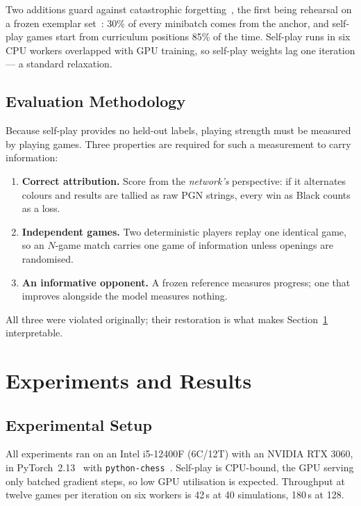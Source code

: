 \documentclass{article}
\begin{document}
Two additions guard against catastrophic
forgetting~\cite{mccloskey1989catastrophic}, the first being rehearsal on a
frozen exemplar set~\cite{rebuffi2017icarl}: 30\% of every minibatch comes
from the anchor, and self-play games start from curriculum positions 85\% of
the time. Self-play runs in six CPU workers overlapped with GPU training, so
self-play weights lag one iteration --- a standard relaxation.

\subsection{Evaluation Methodology}
\label{sec:evalmethod}

Because self-play provides no held-out labels, playing strength must be
measured by playing games. Three properties are required for such a
measurement to carry information:

\begin{enumerate}[noitemsep]
  \item \textbf{Correct attribution.} Score from the \emph{network's}
        perspective: if it alternates colours and results are tallied as raw
        PGN strings, every win as Black counts as a loss.
  \item \textbf{Independent games.} Two deterministic players replay one
        identical game, so an $N$-game match carries one game of information
        unless openings are randomised.
  \item \textbf{An informative opponent.} A frozen reference measures
        progress; one that improves alongside the model measures nothing.
\end{enumerate}

All three were violated originally; their restoration is what makes
Section~\ref{sec:results} interpretable.

\section{Experiments and Results}
\label{sec:results}

\subsection{Experimental Setup}
All experiments ran on an Intel i5-12400F (6C/12T) with an NVIDIA RTX
3060, in PyTorch~2.13~\cite{paszke2019pytorch} with
\texttt{python-chess}~\cite{pythonchess}. Self-play is CPU-bound, the GPU
serving only batched gradient steps, so low GPU utilisation is expected.
Throughput at twelve games per iteration on six workers is 42\,s at 40
simulations, 180\,s at 128.
\end{document}
